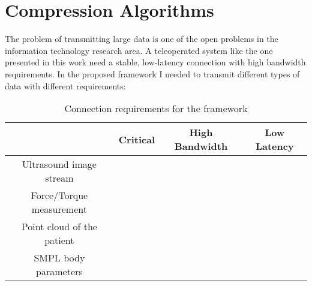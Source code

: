 \newpage
\chapter{Compression Algorithms}

The problem of transmitting large data is one of the open problems in the information technology research area. A teleoperated system like the one presented in this work need a stable, low-latency connection with high bandwidth requirements. In the proposed framework I needed to transmit different types of data with different requirements:
\newcommand{\cmark}{\ding{51}}%
\newcommand{\xmark}{\ding{55}}%

\begin{table*}[!ht]
	\centering
	\caption{Connection requirements for the framework}
	\begin{tabular}{|c|c|c|c|}
		\hline
		& Critical & High Bandwidth & Low Latency \\
		\hline
		Ultrasound image stream & \xmark & \cmark & \cmark \\
		\hline
		Force/Torque measurement & \xmark & \xmark & \cmark \\
		\hline
		Point cloud of the patient & \cmark & \cmark & \cmark \\
		\hline
		SMPL body parameters  & \xmark & \xmark & \xmark \\
		\hline
	\end{tabular}
	\label{tab:comparison}
\end{table*}
